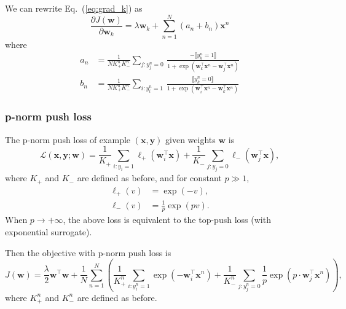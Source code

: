\documentclass[9pt]{extarticle}
\newcommand{\llb}{\llbracket}
\newcommand{\rrb}{\rrbracket}
\newcommand{\x}{\mathbf{x}}
\newcommand{\y}{\mathbf{y}}
\newcommand{\1}{\mathbf{1}}
\newcommand{\w}{\mathbf{w}}
\newcommand{\LCal}{\mathcal{L}}
\newcommand{\pb}[1]{^{({#1})}}
\begin{document}
%
We can rewrite Eq.~(\ref{eq:grad_k}) as
$$
\frac{\partial J(\w)} {\partial \w_k} = \lambda \w_k + \sum_{n=1}^N (a_n + b_n) \x^n
$$
where
\begin{align*}
a_n &= \frac{1}{N K_+^n K_-^n} \underset{j:y_j^n=0}{\sum} \, \frac{-\llb y_k^n=1 \rrb} {1 + \exp(\w_k^\top \x^n - \w_j^\top \x^n)} \\
b_n &= \frac{1}{N K_+^n K_-^n} \underset{i:y_i^n=1}{\sum} \, \frac{ \llb y_k^n=0 \rrb} {1 + \exp(\w_i^\top \x^n - \w_k^\top \x^n)}
\end{align*}



\subsubsection{p-norm push loss}
\label{sssec:pnorm}

The p-norm push loss of example $(\x, \y)$ given weights $\w$ is
\begin{equation}
\label{eq:loss_pnorm}
\LCal(\x, \y; \w) = \frac{1}{K_+} \sum_{i:y_i=1} \ell_+(\w_i^\top \x) + \frac{1}{K_-} \sum_{j:y_j=0} \ell_-(\w_j^\top \x),
\end{equation}
where $K_+$ and $K_-$ are defined as before, 
and for constant $p \gg 1$,
\begin{equation}
\begin{aligned}
\ell_+(v) & = \exp(-v), \\
\ell_-(v) & = \frac{1}{p} \exp(pv).
\end{aligned}
\end{equation}
When $p \to +\infty$, the above loss is equivalent to the top-push loss (with exponential surrogate).

Then the objective with p-norm push loss is
\begin{equation}
\label{eq:obj_pnorm_push}
J(\w) = \frac{\lambda}{2} \w^\top \w + \frac{1}{N} \sum_{n=1}^N \left( 
        \frac{1}{K_+^n} \sum_{i:y_i^n=1} \exp(-\w_i^\top \x^n) + 
        \frac{1}{K_-^n} \sum_{j:y_j^n=0} \frac{1}{p} \exp(p \cdot \w_j^\top \x^n) \right), 
\end{equation}
where $K_+^n$ and $K_-^n$ are defined as before.


\end{document}
